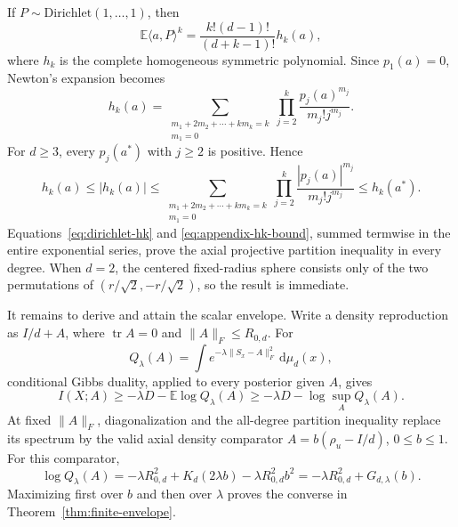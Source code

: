 \documentclass[11pt,a4paper]{article}
\theoremstyle{remark}
\newcommand{\E}{\mathbb{E}}
\newcommand{\Tr}{\operatorname{tr}}
\newcommand{\dd}{\,\mathrm{d}}
\begin{document}
If $P\sim\mathrm{Dirichlet}(1,\ldots,1)$, then
\begin{equation}
 \E\langle a,P\rangle^k
 =\frac{k!(d-1)!}{(d+k-1)!}h_k(a),
 \label{eq:dirichlet-hk}
\end{equation}
where $h_k$ is the complete homogeneous symmetric polynomial.  Since
$p_1(a)=0$, Newton's expansion becomes
\begin{equation}
 h_k(a)=
 \sum_{\substack{m_1+2m_2+\cdots+km_k=k\\m_1=0}}
 \prod_{j=2}^k\frac{p_j(a)^{m_j}}{m_j!j^{m_j}}.
 \label{eq:appendix-newton}
\end{equation}
For $d\ge3$, every $p_j(a^*)$ with $j\ge2$ is positive.  Hence
\begin{equation}
 h_k(a)\le |h_k(a)|
 \le\sum_{\substack{m_1+2m_2+\cdots+km_k=k\\m_1=0}}
 \prod_{j=2}^k\frac{|p_j(a)|^{m_j}}{m_j!j^{m_j}}
 \le h_k(a^*).
 \label{eq:appendix-hk-bound}
\end{equation}
Equations~\eqref{eq:dirichlet-hk} and \eqref{eq:appendix-hk-bound}, summed
termwise in the entire exponential series, prove the axial projective
partition inequality in every degree.  When $d=2$, the centered fixed-radius
sphere consists only of the two permutations of
$(r/\sqrt2,-r/\sqrt2)$, so the result is immediate.

It remains to derive and attain the scalar envelope.  Write a density
reproduction as $I/d+A$, where $\Tr A=0$ and $\|A\|_F\le R_{0,d}$.  For
\begin{equation}
 Q_\lambda(A)=\int
 e^{-\lambda\|S_x-A\|_F^2}\dd\mu_d(x),
 \label{eq:appendix-Q}
\end{equation}
conditional Gibbs duality, applied to every posterior given $A$, gives
\begin{equation}
 I(X;A)\ge-\lambda D-\E\log Q_\lambda(A)
 \ge-\lambda D-\log\sup_AQ_\lambda(A).
 \label{eq:appendix-gibbs}
\end{equation}
At fixed $\|A\|_F$, diagonalization and the all-degree partition inequality
replace its spectrum by the valid axial density comparator
$A=b(\rho_u-I/d)$, $0\le b\le1$.  For this comparator,
\begin{equation}
 \log Q_\lambda(A)
 =-\lambda R_{0,d}^2+K_d(2\lambda b)
  -\lambda R_{0,d}^2b^2
 =-\lambda R_{0,d}^2+G_{d,\lambda}(b).
 \label{eq:appendix-axial-Q}
\end{equation}
Maximizing first over $b$ and then over $\lambda$ proves the converse in
Theorem~\ref{thm:finite-envelope}.
\end{document}

